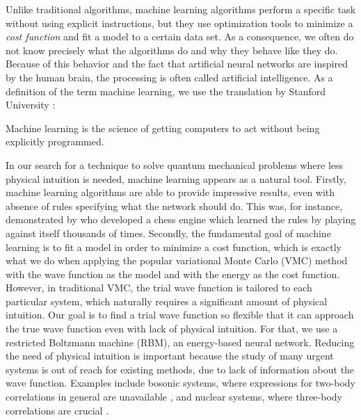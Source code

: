 Unlike traditional algorithms, machine learning algorithms perform a specific task without using explicit instructions, but they use optimization tools to minimize a \textit{cost function} and fit a model to a certain data set. As a consequence, we often do not know precisely what the algorithms do and why they behave like they do. Because of this behavior and the fact that artificial neural networks are inspired by the human brain, the processing is often called artificial intelligence. As a definition of the term machine learning, we use the translation by Stanford University \supercite{noauthor_machine_nodate}:

\begin{shadequote}{}
	Machine learning is the science of getting computers to act without being explicitly programmed.
\end{shadequote}

In our search for a technique to solve quantum mechanical problems where less physical intuition is needed, machine learning appears as a natural tool. Firstly, machine learning algorithms are able to provide impressive results, even with absence of rules specifying what the network should do. This was, for instance, demonstrated by \citet{silver2017mastering} who developed a chess engine which learned the rules by playing against itself thousands of times. Secondly, the fundamental goal of machine learning is to fit a model in order to minimize a cost function, which is exactly what we do when applying the popular variational Monte Carlo (VMC) method with the wave function as the model and with the energy as the cost function. However, in traditional VMC, the trial wave function is tailored to each particular system, which naturally requires a significant amount of physical intuition. Our goal is to find a trial wave function so flexible that it can approach the true wave function even with lack of physical intuition. For that, we use a restricted Boltzmann machine (RBM), an energy-based neural network. Reducing the need of physical intuition is important because the study of many urgent systems is out of reach for existing methods, due to lack of information about the wave function. Examples include bosonic systems, where expressions for two-body correlations in general are unavailable \supercite{holzmann_pair_1999}, and nuclear systems, where three-body correlations are crucial \supercite{sauer_three-nucleon_2014}.

